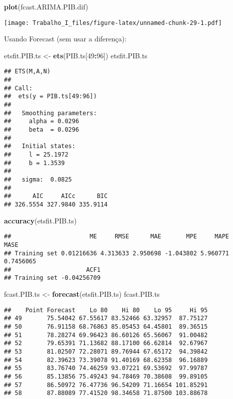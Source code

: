 \documentclass[]{article}
\newenvironment{Shaded}{\begin{snugshade}}{\end{snugshade}}
\newcommand{\KeywordTok}[1]{\textcolor[rgb]{0.13,0.29,0.53}{\textbf{#1}}}
\newcommand{\DecValTok}[1]{\textcolor[rgb]{0.00,0.00,0.81}{#1}}
\newcommand{\StringTok}[1]{\textcolor[rgb]{0.31,0.60,0.02}{#1}}
\newcommand{\OperatorTok}[1]{\textcolor[rgb]{0.81,0.36,0.00}{\textbf{#1}}}
\newcommand{\NormalTok}[1]{#1}
\begin{document}
\begin{Shaded}
\begin{Highlighting}[]
\KeywordTok{plot}\NormalTok{(fcast.ARIMA.PIB.dif)}
\end{Highlighting}
\end{Shaded}

\texttt{[image: Trabalho\_I\_files/figure-latex/unnamed-chunk-29-1.pdf]}

Usando Forecast (sem usar a diferença):

\begin{Shaded}
\begin{Highlighting}[]
\NormalTok{etsfit.PIB.ts <-}\StringTok{ }\KeywordTok{ets}\NormalTok{(PIB.ts[}\DecValTok{49}\OperatorTok{:}\DecValTok{96}\NormalTok{])}
\NormalTok{etsfit.PIB.ts}
\end{Highlighting}
\end{Shaded}

\begin{verbatim}
## ETS(M,A,N) 
## 
## Call:
##  ets(y = PIB.ts[49:96]) 
## 
##   Smoothing parameters:
##     alpha = 0.0296 
##     beta  = 0.0296 
## 
##   Initial states:
##     l = 25.1972 
##     b = 1.3539 
## 
##   sigma:  0.0825
## 
##      AIC     AICc      BIC 
## 326.5554 327.9840 335.9114
\end{verbatim}

\begin{Shaded}
\begin{Highlighting}[]
\KeywordTok{accuracy}\NormalTok{(etsfit.PIB.ts)}
\end{Highlighting}
\end{Shaded}

\begin{verbatim}
##                      ME     RMSE      MAE       MPE     MAPE      MASE
## Training set 0.01216636 4.313633 2.950698 -1.043802 5.960771 0.7456065
##                     ACF1
## Training set -0.04256709
\end{verbatim}

\begin{Shaded}
\begin{Highlighting}[]
\NormalTok{fcast.PIB.ts <-}\StringTok{ }\KeywordTok{forecast}\NormalTok{(etsfit.PIB.ts)}
\NormalTok{fcast.PIB.ts}
\end{Highlighting}
\end{Shaded}

\begin{verbatim}
##    Point Forecast    Lo 80    Hi 80    Lo 95     Hi 95
## 49       75.54042 67.55617 83.52466 63.32957  87.75127
## 50       76.91158 68.76863 85.05453 64.45801  89.36515
## 51       78.28274 69.96423 86.60126 65.56067  91.00482
## 52       79.65391 71.13682 88.17100 66.62814  92.67967
## 53       81.02507 72.28071 89.76944 67.65172  94.39842
## 54       82.39623 73.39078 91.40169 68.62358  96.16889
## 55       83.76740 74.46259 93.07221 69.53692  97.99787
## 56       85.13856 75.49243 94.78469 70.38608  99.89105
## 57       86.50972 76.47736 96.54209 71.16654 101.85291
## 58       87.88089 77.41520 98.34658 71.87500 103.88678
\end{verbatim}
\end{document}
